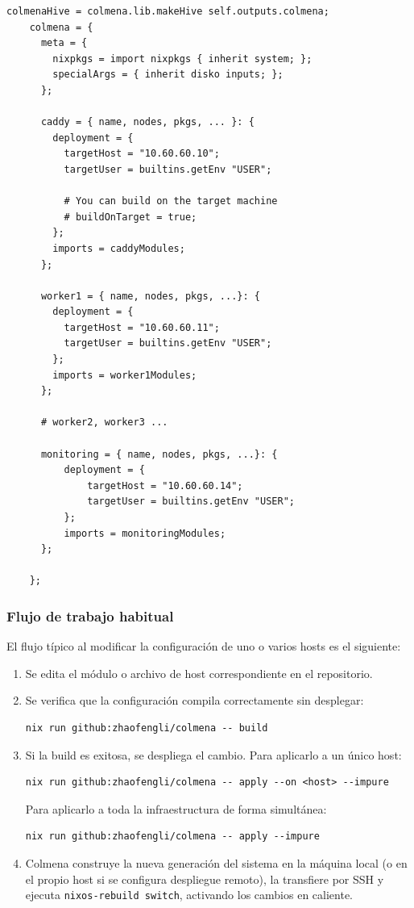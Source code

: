 \documentclass[a4paper, 11pt]{article}
\begin{document}
\begin{lstlisting}[style=nix]
colmenaHive = colmena.lib.makeHive self.outputs.colmena;
    colmena = {
      meta = {
        nixpkgs = import nixpkgs { inherit system; };
        specialArgs = { inherit disko inputs; };
      };

      caddy = { name, nodes, pkgs, ... }: {
        deployment = {
          targetHost = "10.60.60.10";
          targetUser = builtins.getEnv "USER";

          # You can build on the target machine
          # buildOnTarget = true;
        };
        imports = caddyModules;
      };

      worker1 = { name, nodes, pkgs, ...}: {
        deployment = {
          targetHost = "10.60.60.11";
          targetUser = builtins.getEnv "USER";
        };
        imports = worker1Modules;
      };

      # worker2, worker3 ...

      monitoring = { name, nodes, pkgs, ...}: {
          deployment = {
              targetHost = "10.60.60.14";
              targetUser = builtins.getEnv "USER";
          };
          imports = monitoringModules;
      };

    };
\end{lstlisting}

\subsubsection{Flujo de trabajo habitual}

El flujo típico al modificar la configuración de uno o varios hosts es el siguiente:

\begin{enumerate}
  \item Se edita el módulo o archivo de host correspondiente en el repositorio.
  \item Se verifica que la configuración compila correctamente sin desplegar:
\begin{verbatim}
nix run github:zhaofengli/colmena -- build
\end{verbatim}
  \item Si la build es exitosa, se despliega el cambio. Para aplicarlo a un único host:
\begin{verbatim}
nix run github:zhaofengli/colmena -- apply --on <host> --impure
\end{verbatim}
  Para aplicarlo a toda la infraestructura de forma simultánea:
\begin{verbatim}
nix run github:zhaofengli/colmena -- apply --impure
\end{verbatim}
  \item Colmena construye la nueva generación del sistema en la máquina local (o 
    en el propio host si se configura despliegue remoto), 
    la transfiere por SSH y ejecuta \texttt{nixos-rebuild switch}, activando los 
    cambios en caliente.
\end{enumerate}
\end{document}
